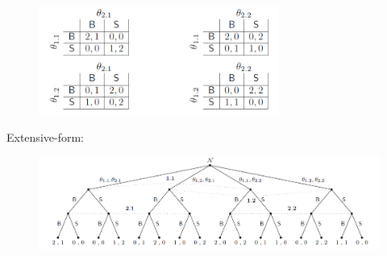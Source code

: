\begin{figure}[H]
\centering
\includegraphics[width=0.7\textwidth]{images/img_1_8_01.png}
\end{figure}
Extensive-form:
\begin{figure}[H]
\centering
\includegraphics[width=\textwidth]{images/img_1_8_02.png}
\end{figure}



